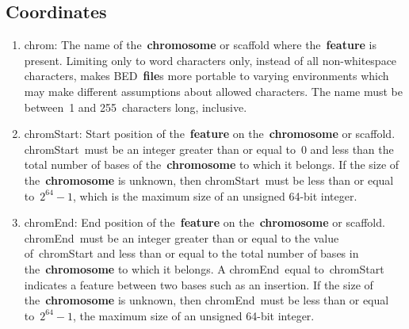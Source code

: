 \documentclass[11pt]{article}
\begin{document}
\subsection{Coordinates}
\begin{enumerate}
\item \textsf{chrom}: The name of the~\textbf{chromosome} or scaffold where the~\textbf{feature} is present.
  Limiting only to word characters only, instead of all non-whitespace characters, makes \ac{BED}~\textbf{file}s more portable to varying environments which may make different assumptions about allowed characters.
  The name must be between~1 and 255~characters long, inclusive.

\item \textsf{chromStart}: Start position of the~\textbf{feature} on the~\textbf{chromosome} or scaffold.
  \textsf{chromStart}~must be an integer greater than or equal to~0 and less than the total number of bases of the~\textbf{chromosome} to which it belongs.
  If the size of the~\textbf{chromosome} is unknown, then \textsf{chromStart}~must be less than or equal to~$2^{64} - 1$, which is the maximum size of an unsigned 64-bit integer.

\item \textsf{chromEnd}: End position of the~\textbf{feature} on the~\textbf{chromosome} or scaffold.
  \textsf{chromEnd}~must be an integer greater than or equal to the value of~\textsf{chromStart} and less than or equal to the total number of bases in the~\textbf{chromosome} to which it belongs.
  A \textsf{chromEnd}~equal to~\textsf{chromStart} indicates a feature between two bases such as an insertion.
  If the size of the~\textbf{chromosome} is unknown, then \textsf{chromEnd}~must be less than or equal to~$2^{64} - 1$, the maximum size of an unsigned 64-bit integer.
\end{enumerate}
\end{document}
